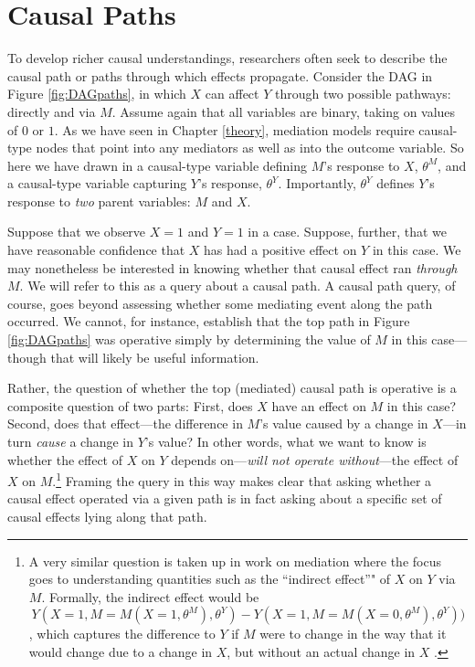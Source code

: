 \documentclass[
  12pt,
]{book}
\begin{document}
\hypertarget{causal-paths}{%
\section{Causal Paths}\label{causal-paths}}

To develop richer causal understandings, researchers often seek to describe the causal path or paths through which effects propagate. Consider the DAG in Figure \ref{fig:DAGpaths}, in which \(X\) can affect \(Y\) through two possible pathways: directly and via \(M\). Assume again that all variables are binary, taking on values of \(0\) or \(1\). As we have seen in Chapter \ref{theory}, mediation models require causal-type nodes that point into any mediators as well as into the outcome variable. So here we have drawn in a causal-type variable defining \(M\)'s response to \(X\), \(\theta^M\), and a causal-type variable capturing \(Y\)'s response, \(\theta^Y\). Importantly, \(\theta^Y\) defines \(Y\)'s response to \emph{two} parent variables: \(M\) and \(X\).

Suppose that we observe \(X=1\) and \(Y=1\) in a case. Suppose, further, that we have reasonable confidence that \(X\) has had a positive effect on \(Y\) in this case. We may nonetheless be interested in knowing whether that causal effect ran \emph{through} \(M\). We will refer to this as a query about a causal path. A causal path query, of course, goes beyond assessing whether some mediating event along the path occurred. We cannot, for instance, establish that the top path in Figure \ref{fig:DAGpaths} was operative simply by determining the value of \(M\) in this case---though that will likely be useful information.

Rather, the question of whether the top (mediated) causal path is operative is a composite question of two parts: First, does \(X\) have an effect on \(M\) in this case? Second, does that effect---the difference in \(M\)'s value caused by a change in \(X\)---in turn \emph{cause} a change in \(Y\)'s value? In other words, what we want to know is whether the effect of \(X\) on \(Y\) depends on---\emph{will not operate without}---the effect of \(X\) on \(M\).\footnote{A very similar question is taken up in work on mediation where the focus goes to understanding quantities such as the ``indirect effect''" of \(X\) on \(Y\) via \(M\). Formally, the indirect effect would be \[Y(X=1, M = M(X=1,\theta^M), 
  \theta^Y) - Y(X = 1, M = M(X=0, \theta^M), \theta^Y))\], which captures the difference to \(Y\) if \(M\) were to change in the way that it would change due to a change in \(X\), but without an actual change in \(X\) \citep[ p 132, \citet{imai2010general}]{pearl2009causality}.} Framing the query in this way makes clear that asking whether a causal effect operated via a given path is in fact asking about a specific set of causal effects lying along that path.
\end{document}
